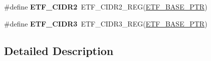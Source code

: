 \begin{DoxyCompactItemize}
\item 
\hypertarget{group___e_t_f___register___accessor___macros_ga0e849979e159aabdbb0331c0679e3c0c}{}\#define {\bfseries E\+T\+F\+\_\+\+C\+I\+D\+R2}~E\+T\+F\+\_\+\+C\+I\+D\+R2\+\_\+\+R\+E\+G(\hyperlink{group___e_t_f___peripheral_ga46da3f879a5311a0651d7908021daa5e}{E\+T\+F\+\_\+\+B\+A\+S\+E\+\_\+\+P\+T\+R})\label{group___e_t_f___register___accessor___macros_ga0e849979e159aabdbb0331c0679e3c0c}

\item 
\hypertarget{group___e_t_f___register___accessor___macros_gafb0168c9dc119257f3f16054b469d53d}{}\#define {\bfseries E\+T\+F\+\_\+\+C\+I\+D\+R3}~E\+T\+F\+\_\+\+C\+I\+D\+R3\+\_\+\+R\+E\+G(\hyperlink{group___e_t_f___peripheral_ga46da3f879a5311a0651d7908021daa5e}{E\+T\+F\+\_\+\+B\+A\+S\+E\+\_\+\+P\+T\+R})\label{group___e_t_f___register___accessor___macros_gafb0168c9dc119257f3f16054b469d53d}

\end{DoxyCompactItemize}


\subsection{Detailed Description}
